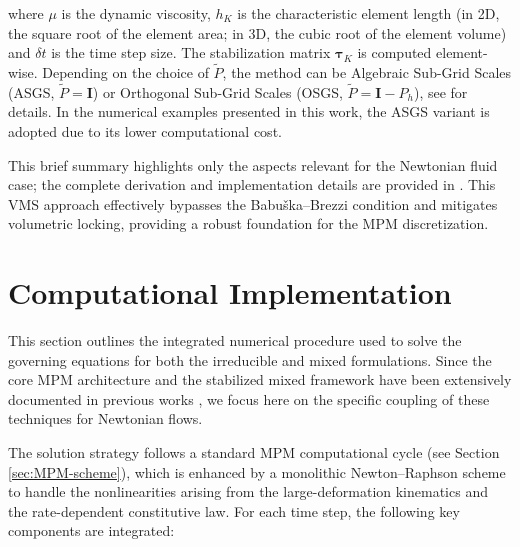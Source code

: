 \documentclass[11pt,english]{article}
\def\Identity{\mathbf{I}}
\begin{document}
    where $\mu$ is the dynamic viscosity,  $h_K$ is the characteristic element length (in 2D, the square root of the element area; in 3D, the cubic root of the element volume) and $\delta t$ is the time step size. 
    The stabilization matrix $\boldsymbol{\tau}_K$ is computed element-wise. 
    Depending on the choice of $\tilde{P}$, the method can be Algebraic Sub-Grid Scales (ASGS, $\tilde{P}=\Identity$) or Orthogonal Sub-Grid Scales (OSGS, $\tilde{P} = \Identity-P_h$), see \cite{castanar2020stabilized} for details. In the numerical examples presented in this work, the ASGS variant is adopted due to its lower computational cost.
    
    This brief summary highlights only the aspects relevant for the Newtonian fluid case; the complete derivation and implementation details are provided in \cite{castanar2020stabilized,cervera2010mixeda}.
    This VMS approach effectively bypasses the Babuška--Brezzi condition and mitigates volumetric locking, providing a robust foundation for the MPM discretization.

%
%
    \section{Computational Implementation \label{sec:Algorithm}}

    This section outlines the integrated numerical procedure used to solve the governing equations for both the irreducible and mixed formulations. Since the core MPM architecture and the stabilized mixed framework have been extensively documented in previous works \cite{iaconeta2019stabilized,moreno2025mixed}, we focus here on the specific coupling of these techniques for Newtonian flows.
    
    The solution strategy follows a standard MPM computational cycle (see Section \ref{sec:MPM-scheme}), which is enhanced by a monolithic Newton--Raphson scheme to handle the nonlinearities arising from the large-deformation kinematics and the rate-dependent constitutive law. For each time step, the following key components are integrated:
    
\end{document}
